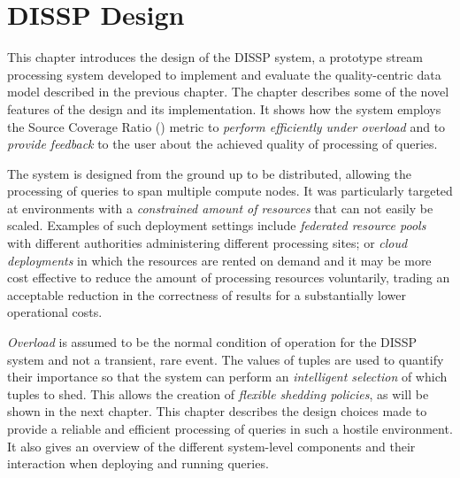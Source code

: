 \chapter{DISSP Design}
\label{ch:system_design}

This chapter introduces the design of the DISSP system, a prototype stream processing system developed to
implement and evaluate the quality-centric data model described in the previous chapter. 
The chapter describes some of the novel features of the design and its implementation.
It shows how the system employs the Source Coverage Ratio (\sic) metric to \emph{perform efficiently
under overload} and to \emph{provide feedback} to the user about the achieved quality of processing of
queries.

The system is designed from the ground up to be distributed, allowing the processing of queries to
span multiple compute nodes.
It was particularly targeted at environments with a \emph{constrained amount of resources} that can not
easily be scaled. Examples of such deployment settings include \emph{federated resource
pools} with different authorities administering different processing sites; or \emph{cloud deployments}
in which the resources are rented on demand and it may be more cost effective to reduce the
amount of processing resources voluntarily, trading an acceptable reduction in the correctness of results
for a substantially lower operational costs. 

\emph{Overload} is assumed to be the normal condition of operation for the DISSP system and not a
transient, rare event. 
The \sic values of tuples are used to quantify their importance so that the system can perform an 
\emph{intelligent selection} of which tuples to shed. This allows the creation of \emph{flexible shedding
policies}, as will be shown in the next chapter.
This chapter describes the design choices made to provide a reliable and efficient
processing of queries in such a hostile environment.
It also gives an overview of the different system-level components and their interaction when deploying
and running queries. 















	



		

